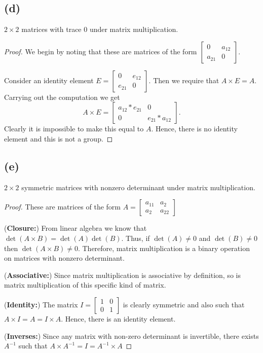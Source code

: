\documentclass{article}
\begin{document}
\subsection*{(d)}
$2\times 2$ matrices with trace 0 under matrix multiplication.

\begin{proof}
    We begin by noting that these are matrices of the form $\begin{bmatrix}
            0      & a_{12} \\
            a_{21} & 0
        \end{bmatrix}$.

    Consider an identity element $E = \begin{bmatrix}
            0      & e_{12} \\
            e_{21} & 0
        \end{bmatrix}$. Then we require that $A \times E = A$. Carrying out the computation we get
    \begin{equation*}
        A \times E  = \begin{bmatrix}
            a_{12}*e_{21} & 0             \\
            0             & e_{21}*a_{12}
        \end{bmatrix}.
    \end{equation*}
    Clearly it is impossible to make this equal to $A$. Hence, there is no identity element and this is not
    a group.
\end{proof}

\subsection*{(e)}
$2\times 2$ symmetric matrices with nonzero determinant under matrix multiplication.

\begin{proof}
    These are matrices of the form $A = \begin{bmatrix}
            a_{11} & a_{2}  \\
            a_2    & a_{22}
        \end{bmatrix}$

    (\textbf{Closure:})
    From linear algebra we know that $\det(A\times B) = \det(A)\det(B)$. Thus,
    if $\det(A) \neq 0$ and $\det(B) \neq 0$ then $\det(A\times B) \neq 0$.
    Therefore, matrix multiplication is a binary operation on matrices with
    nonzero determinant.

    (\textbf{Associative:}) Since matrix multiplication is associative by definition, so is
    matrix multiplication of this specific kind of matrix.

    (\textbf{Identity:}) The matrix $I = \begin{bmatrix}
            1 & 0 \\
            0 & 1
        \end{bmatrix}$ is clearly symmetric and also such that $A\times I = A = I \times A$.
    Hence, there is an identity element.

    (\textbf{Inverses:}) Since any matrix with non-zero determinant is invertible, there exists
    $A^{-1}$ such that $A\times A^{-1} = I = A^{-1}\times A$
\end{proof}
\end{document}
